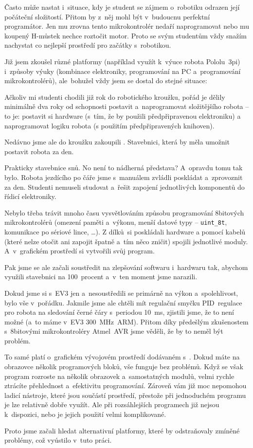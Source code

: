 Často může nastat i~situace, kdy je student se zájmem o~robotiku odrazen její počáteční složitostí.
Přitom by z~něj mohl být v~budoucnu perfektní programátor. 
Jen mu zrovna tento mikrokontrolér nedaří naprogramovat nebo mu koupený H-můstek nechce roztočit motor.
Proto se svým studentům vždy snažím nachystat co nejlepší prostředí pro začátky s~robotikou. 

Již jsem zkoušel různé platformy (například využít k~výuce robota Pololu~3pi) i~způsoby výuky (kombinace elektroniky, programování na PC a~programování mikrokontrolérů), ale~bohužel vždy jsem se dostal do stejné situace:

Ačkoliv mi studenti chodili již rok do robotického kroužku, pořád je dělily minimálně dva roky od schopnosti postavit a~naprogramovat složitějšího robota -- to je: postavit si hardware (s~tím, že by použili předpřipravenou elektroniku) a naprogramovat logiku robota (s použitím předpřipravených knihoven).

Nedávno jsme ale do kroužku zakoupili \legoEV{}. 
Stavebnici, která by měla umožnit postavit robota za den. 

Prakticky stavebnice snů. No není to nádherná představa?
A~opravdu tomu tak bylo. Robota jezdícího po čáře jsme s~manuálem zvládli poskládat a~zprovoznit za den. 
Studenti nemuseli studovat a~řešit zapojení jednotlivých komponentů do řídicí elektroniky. 

Nebylo třeba trávit mnoho času vysvětlováním způsobu programování 8bitových mikrokontrolérů (omezení paměti a~výkonu, menší datové typy -- \verb|uint_8t|, komunikace po sériové lince, \dots). 
Z dílků~\lega{ }si poskládali hardware a pomocí kabelů (které nelze otočit ani zapojit špatně a~tím něco zničit) spojili jednotlivé moduly. A~v~grafickém prostředí si vytvořili svůj program.


Pak jsme se ale začali soustředit na zlepšování softwaru i~hardwaru tak, abychom využili stavebnici na 100~procent a~v~ten moment jsme narazili.

Dokud jsme si s~EV3 jen  a~nesoustředili se primárně na výkon a~spolehlivost, bylo vše v~pořádku. 
Jakmile jsme ale chtěli mít regulační smyčku PID~regulace pro robota na sledování černé čáry s~periodou 10~ms, zjistili jsme, že to není možné (a~to máme v~EV3  300~MHz~ARM). Přitom díky předešlým zkušenostem s~8bitovými mikrokontroléry Atmel~AVR jsme věděli, že by to neměl být problém.


To samé platí o~grafickém vývojovém prostředí dodávaném s~\EVthree. Dokud máte na obrazovce několik programových bloků, vše funguje bez problémů. 
Když se však program rozroste na několik obrazovek a~samostatných modulů, velmi rychle ztrácíte přehlednost a~efektivitu programování.
Zároveň vám již moc nepomohou ladicí nástroje, které jsou součástí prostředí, přestože při jednoduchém programu je lze relativně dobře využít. Ale při rozsáhlejších programech již nejsou k~dispozici, nebo je jejich použití velmi komplikované. 


Proto jsme začali hledat alternativní platformy, které by odstraňovaly zmíněné problémy, což vyústilo v~tuto práci.   

